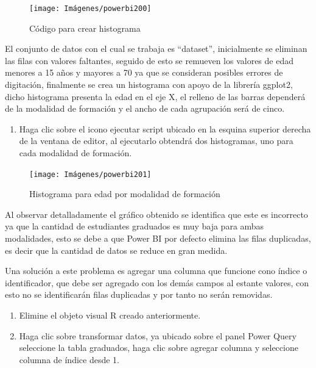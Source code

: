 \documentclass[
]{book}
\providecommand{\tightlist}{%
  \setlength{\itemsep}{0pt}\setlength{\parskip}{0pt}}
\begin{document}
\begin{figure}

{\centering \texttt{[image: Imágenes/powerbi200]} 

}

\caption{Código para crear histograma}\label{fig:paso5histogramapowerbi-fig}
\end{figure}

El conjunto de datos con el cual se trabaja es ``dataset'', inicialmente se eliminan las filas con valores faltantes, seguido de esto se remueven los valores de edad menores a 15 años y mayores a 70 ya que se consideran posibles errores de digitación, finalmente se crea un histograma con apoyo de la librería ggplot2, dicho histograma presenta la edad en el eje X, el relleno de las barras dependerá de la modalidad de formación y el ancho de cada agrupación será de cinco.

\begin{enumerate}
\def\labelenumi{\arabic{enumi}.}
\setcounter{enumi}{5}
\tightlist
\item
  Haga clic sobre el icono ejecutar script ubicado en la esquina superior derecha de la ventana de editor, al ejecutarlo obtendrá dos histogramas, uno para cada modalidad de formación.
\end{enumerate}

\begin{figure}

{\centering \texttt{[image: Imágenes/powerbi201]} 

}

\caption{Histograma para edad por modalidad de formación}\label{fig:paso6histogramapowerbi-fig}
\end{figure}

Al observar detalladamente el gráfico obtenido se identifica que este es incorrecto ya que la cantidad de estudiantes graduados es muy baja para ambas modalidades, esto se debe a que Power BI por defecto elimina las filas duplicadas, es decir que la cantidad de datos se reduce en gran medida.

Una solución a este problema es agregar una columna que funcione cono índice o identificador, que debe ser agregado con los demás campos al estante valores, con esto no se identificarán filas duplicadas y por tanto no serán removidas.

\begin{enumerate}
\def\labelenumi{\arabic{enumi}.}
\item
  Elimine el objeto visual R creado anteriormente.
\item
  Haga clic sobre transformar datos, ya ubicado sobre el panel Power Query seleccione la tabla graduados, haga clic sobre agregar columna y seleccione columna de índice desde 1.
\end{enumerate}
\end{document}
